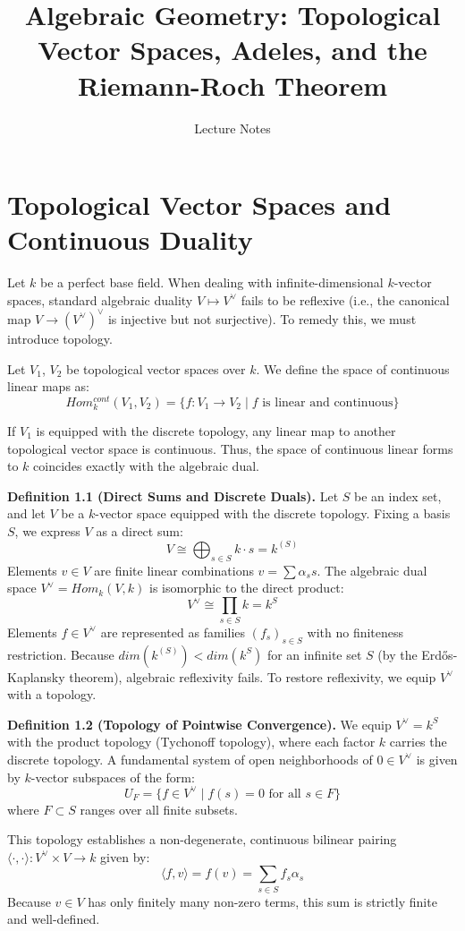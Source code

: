 \documentclass[12pt]{article}
\title{Algebraic Geometry: Topological Vector Spaces, Adeles, and the Riemann-Roch Theorem}
\author{Lecture Notes}
\date{}
\begin{document}
\maketitle

\section{Topological Vector Spaces and Continuous Duality}

Let $k$ be a perfect base field. When dealing with infinite-dimensional $k$-vector spaces, standard algebraic duality $V\mapsto V^{\vee}$ fails to be reflexive (i.e., the canonical map $V\rightarrow (V^{\vee})^{\vee}$ is injective but not surjective). To remedy this, we must introduce topology.

Let $V_{1}$, $V_{2}$ be topological vector spaces over $k$. We define the space of continuous linear maps as:
$$Hom_k^{cont} (V_1, V_2) = \{f: V_1 \rightarrow V_2 \mid f \text{ is linear and continuous}\}$$

If $V_{1}$ is equipped with the discrete topology, any linear map to another topological vector space is continuous. Thus, the space of continuous linear forms to $k$ coincides exactly with the algebraic dual.

\textbf{Definition 1.1 (Direct Sums and Discrete Duals).} Let $S$ be an index set, and let $V$ be a $k$-vector space equipped with the discrete topology. Fixing a basis $S$, we express $V$ as a direct sum:
$$V\cong\bigoplus_{s\in S}k\cdot s=k^{(S)}$$
Elements $v\in V$ are finite linear combinations $v=\sum\alpha_{s}s$. The algebraic dual space $V^{\vee}=Hom_{k}(V,k)$ is isomorphic to the direct product:
$$V^{\vee}\cong\prod_{s\in S}k=k^{S}$$
Elements $f\in V^{\vee}$ are represented as families $(f_{s})_{s\in S}$ with no finiteness restriction. Because $dim(k^{(S)})<dim(k^{S})$ for an infinite set $S$ (by the Erdős-Kaplansky theorem), algebraic reflexivity fails. To restore reflexivity, we equip $V^{\vee}$ with a topology.

\textbf{Definition 1.2 (Topology of Pointwise Convergence).} We equip $V^{\vee}=k^{S}$ with the product topology (Tychonoff topology), where each factor $k$ carries the discrete topology. A fundamental system of open neighborhoods of $0\in V^{\vee}$ is given by $k$-vector subspaces of the form:
$$U_{F}=\{f\in V^{\vee} \mid f(s)=0 \text{ for all } s\in F\}$$
where $F\subset S$ ranges over all finite subsets.

This topology establishes a non-degenerate, continuous bilinear pairing $\langle \cdot, \cdot \rangle: V^{\vee} \times V\rightarrow k$ given by:
$$\langle f,v\rangle=f(v)=\sum_{s\in S}f_{s}\alpha_{s}$$
Because $v\in V$ has only finitely many non-zero terms, this sum is strictly finite and well-defined.
\end{document}

